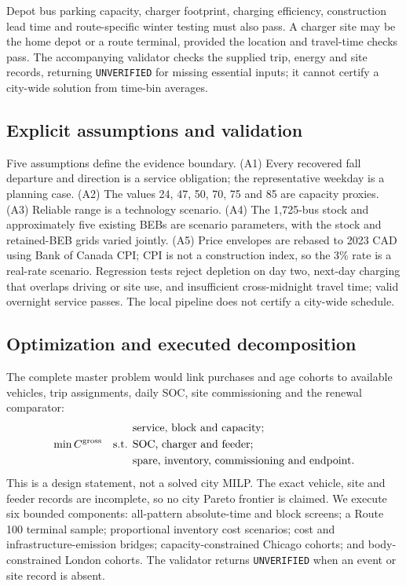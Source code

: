 \documentclass[12pt,letterpaper]{article}
\begin{document}
Depot bus parking capacity, charger footprint, charging efficiency, construction lead time and route-specific winter testing must also pass. A charger site may be the home depot or a route terminal, provided the location and travel-time checks pass. The accompanying validator checks the supplied trip, energy and site records, returning \texttt{UNVERIFIED} for missing essential inputs; it cannot certify a city-wide solution from time-bin averages.

\subsection{Explicit assumptions and validation}
Five assumptions define the evidence boundary. (A1) Every recovered fall departure and direction is a service obligation; the representative weekday is a planning case. (A2) The values 24, 47, 50, 70, 75 and 85 are capacity proxies. (A3) Reliable range is a technology scenario.  (A4) The 1,725-bus stock and approximately five existing BEBs are scenario parameters, with the stock and retained-BEB grids varied jointly. (A5) Price envelopes are rebased to 2023 CAD using Bank of Canada CPI; CPI is not a construction index, so the 3\% rate is a real-rate scenario. Regression tests reject depletion on day two, next-day charging that overlaps driving or site use, and insufficient cross-midnight travel time; valid overnight service passes. The local pipeline does not certify a city-wide schedule.

\subsection{Optimization and executed decomposition}
The complete master problem would link purchases and age cohorts to available vehicles, trip assignments, daily SOC, site commissioning and the renewal comparator:
\begin{equation}
\min C^{\rm gross}\quad\text{s.t. }
\begin{aligned}
&\text{service, block and capacity;}\\
&\text{SOC, charger and feeder;}\\
&\text{spare, inventory, commissioning and endpoint.}
\end{aligned}
\end{equation}
This is a design statement, not a solved city MILP. The exact vehicle, site and feeder records are incomplete, so no city Pareto frontier is claimed. We execute six bounded components: all-pattern absolute-time and block screens; a Route 100 terminal sample; proportional inventory cost scenarios; cost and infrastructure-emission bridges; capacity-constrained Chicago cohorts; and body-constrained London cohorts. The validator returns \texttt{UNVERIFIED} when an event or site record is absent.\cite{rogge,pelletier,gkiotsalitis}
\end{document}
